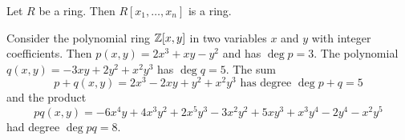\begin{lemma}\label{3.1.2}
    Let $R$ be a ring. Then  $R[x_1, \dots, x_n]$ is a ring.
\end{lemma}

\begin{example}\label{3.2}
    Consider the polynomial ring $\mathbb{Z}[x,y]$ in two variables $x$ and  $y$ with
    integer coefficients. Then $p(x,y)=2x^3+xy-y^2$ and has $\deg{p}=3$. The
    polynomial $q(x,y)=-3xy+2y^2+x^2y^3$ has $\deg{q}=5$. The sum
    \begin{equation*}
        p+q(x,y)=2x^3-2xy+y^2+x^2y^3 \text{ has degree } \deg{p+q}=5
    \end{equation*}
    and the product
    \begin{equation*}
        pq(x,y)=-6x^4y+4x^3y^2+2x^5y^3-3x^2y^2+5xy^3+x^3y^4-2y^4-x^2y^5
    \end{equation*}
    had degree $\deg{pq}=8$.
\end{example}
